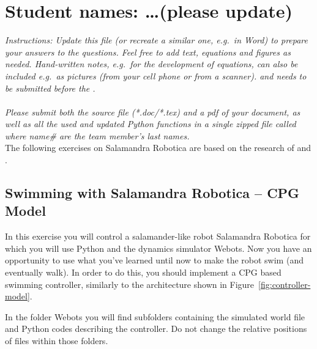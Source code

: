 \documentclass{cmc}
\begin{document}
\pagestyle{fancy}
 

\section*{Student names: \ldots (please update)}

\textit{Instructions: Update this file (or recreate a similar one, e.g.\ in
  Word) to prepare your answers to the questions. Feel free to add text,
  equations and figures as needed. Hand-written notes, e.g.\ for the development
  of equations, can also be included e.g.\ as pictures (from your cell phone or
  from a scanner).  \textbf{} and needs to be
  submitted before the \textbf{}.\\
  \textbf{}\\ Please submit both the source
  file (*.doc/*.tex) and a pdf of your document, as well as all the used and
  updated Python functions in a single zipped file called
   where name\# are the team
  member’s last names.  }
\\

The following exercises on Salamandra Robotica are based on the research of
\cite{Crespi2013} and \cite{Karakasiliotis2013}.

\subsection*{Swimming with Salamandra Robotica – CPG Model}
\label{sec:exploring-swimming}

In this exercise you will control a salamander-like robot Salamandra Robotica
for which you will use Python and the dynamics simulator Webots. Now you have an
opportunity to use what you’ve learned until now to make the robot swim (and
eventually walk). In order to do this, you should implement a CPG based swimming
controller, similarly to the architecture shown in
Figure~\ref{fig:controller-model}.

In the folder Webots you will find subfolders containing the simulated world
file and Python codes describing the controller. Do not change the relative
positions of files within those folders.
\end{document}
